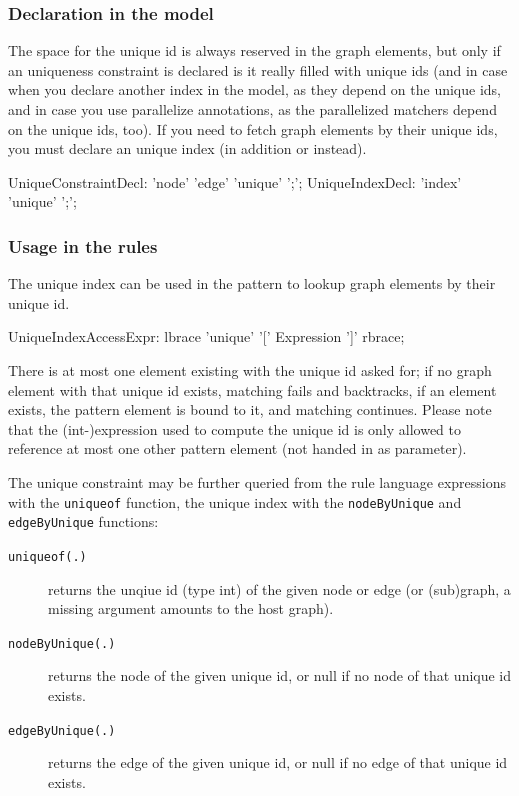 \subsubsection*{Declaration in the model}
The space for the unique id is always reserved in the graph elements, but only if an uniqueness constraint is declared is it really filled with unique ids (and in case when you declare another index in the model, as they depend on the unique ids, and in case you use parallelize annotations, as the parallelized matchers depend on the unique ids, too).
If you need to fetch graph elements by their unique ids, you must declare an unique index (in addition or instead).

\begin{rail}
  UniqueConstraintDecl: 'node' 'edge' 'unique' ';';
  UniqueIndexDecl: 'index' 'unique' ';';
\end{rail}


\subsubsection*{Usage in the rules}
The unique index can be used in the pattern to lookup graph elements by their unique id.

\begin{rail}
  UniqueIndexAccessExpr:
    lbrace 'unique' '[' Expression ']' rbrace;
\end{rail}

There is at most one element existing with the unique id asked for; if no graph element with that unique id exists, matching fails and backtracks, if an element exists, the pattern element is bound to it, and matching continues.
Please note that the (int-)expression used to compute the unique id is only allowed to reference at most one other pattern element (not handed in as parameter).

The unique constraint may be further queried from the rule language expressions with the \texttt{uniqueof} function,
the unique index with the \texttt{nodeByUnique} and \texttt{edgeByUnique} functions:
\begin{description}
\item[\texttt{uniqueof(.)}] returns the unqiue id (type int) of the given node or edge (or (sub)graph, a missing argument amounts to the host graph).
\item[\texttt{nodeByUnique(.)}] returns the node of the given unique id, or null if no node of that unique id exists.
\item[\texttt{edgeByUnique(.)}] returns the edge of the given unique id, or null if no edge of that unique id exists.
\end{description}

